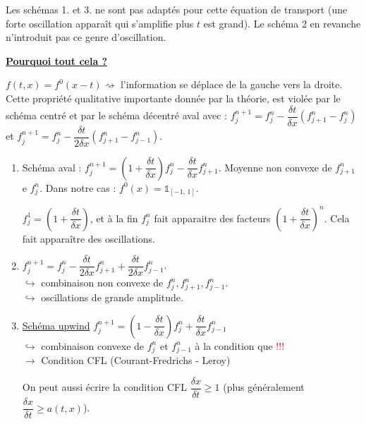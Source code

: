 \documentclass[12pt,a4paper]{article}
\begin{document}
	Les schémas 1. et 3. ne sont pas adaptés pour cette équation de transport (une forte oscillation apparaît qui s'amplifie plus $t$ est grand). Le schéma 2 en revanche n'introduit pas ce genre d'oscillation.
	
	\large{\textbf{\underline{Pourquoi tout cela ?}}}
	
	$f(t,x) = f^0(x-t) \rightsquigarrow$ l'information se déplace de la gauche vers la droite. Cette propriété qualitative importante donnée par la théorie, est violée par le schéma centré et par le schéma décentré aval avec : $f_j^{n+1} = f_j^n - \dfrac{\delta t}{\delta x}(f_{j+1}^n - f_j^n)$ et $f_j^{n+1} = f_j^n - \dfrac{\delta t}{2\delta x}(f_{j+1}^n - f_{j-1}^n)$.\\
	
	\textbf{}
	
	\begin{enumerate}
		\item Schéma aval : $f_j^{n+1} = \left(1+\dfrac{\delta t}{\delta x}\right)f_j^n - \dfrac{\delta t}{\delta x}f_{j+1}^n$. Moyenne non convexe de $f_{j+1}^n$ e $f_j^n$. Dans notre cas : $f^0(x) = \mathbb1_{[-1,\, 1]}$.
		\begin{center}
		\end{center}
		
		$f_j^1 = \left(1+\dfrac{\delta t}{\delta x}\right)$, et à la fin $f_j^n$ fait apparaitre des facteurs $\left(1+\dfrac{\delta t}{\delta x}\right)^n$. Cela fait apparaître des oscillations.
		
		\item $f_j^{n+1} = f_j^n - \dfrac{\delta t}{2\delta x} f_{j+1}^n + \dfrac{\delta t}{2\delta x} f_{j-1}^n$.\\
		$\hookrightarrow$ combinaison non convexe  de $f_j^n, f_{j+1}^n, f_{j-1}^n$.\\
		$\hookrightarrow$ oscillations de grande amplitude.
		
		\item  \underline{Schéma upwind} $f_j^{n+1} = \left(1-\dfrac{\delta t}{\delta x}\right)f_j^n + \dfrac{\delta t}{\delta x}f_{j-1}^n$\\
		$\hookrightarrow$ combinaison convexe de $f_j^n$ et $f_{j-1}^n$ à la condition que  \textcolor{red}{!}\textcolor{red}{!}\textcolor{red}{!}\\
		$\longrightarrow$ Condition CFL (Courant-Fredrichs - Leroy)
		
		On peut aussi écrire la condition CFL $\dfrac{\delta x}{\delta t} \geq 1$ (plus généralement $\dfrac{\delta x}{\delta t} \geq a(t,x)$).
	\end{enumerate}
	
\end{document}

